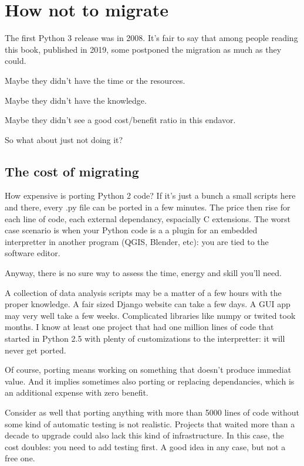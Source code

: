 \chapter{How not to migrate}

The first Python 3 release was in 2008. It's fair to say that among people reading this book, published in 2019, some postponed the migration as much as they could.

Maybe they didn't have the time or the resources.

Maybe they didn't have the knowledge.

Maybe they didn't see a good cost/benefit ratio in this endavor.

So what about just not doing it?

\section{The cost of migrating}

How expensive is porting Python 2 code? If it's just a bunch a small scripts here and there, every .py file can be ported in a few minutes. The price then rise for each line of code, each external dependancy, espacially C extensions. The worst case scenario is when your Python code is a a plugin for an embedded interpretter in another program (QGIS, Blender, etc): you are tied to the software editor.

Anyway, there is no sure way to assess the time, energy and skill you'll need.

A collection of data analysis scripts may be a matter of a few hours with the proper knowledge. A fair sized Django website can take a few days. A GUI app may very well take a few weeks. Complicated libraries like numpy or twited took months. I know at least one project that had one million lines of code that started in Python 2.5 with plenty of customizations to the interpretter: it will never get ported.

Of course, porting means working on something that doesn't produce immediat value. And it implies sometimes also porting or replacing dependancies, which is an additional expense with zero benefit.

Consider as well that porting anything with more than 5000 lines of code without some kind of automatic testing is not realistic. Projects that waited more than a decade to upgrade could also lack this kind of infrastructure. In this case, the cost doubles: you need to add testing first. A good idea in any case, but not a free one.

